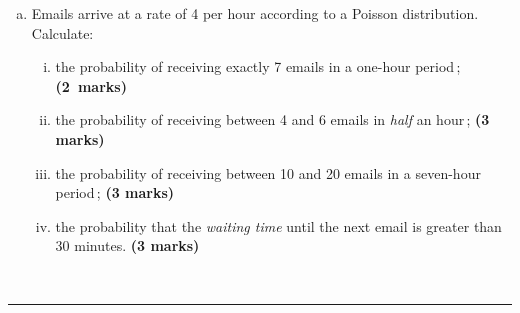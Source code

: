 \documentclass[12pt]{article}
\begin{document}
\begin{enumerate}[a)]
\item Emails arrive at a rate of 4 per hour according to a Poisson distribution.\\[0.3cm]
    Calculate:
    \begin{enumerate}[i)]\itemsep0.3cm
    \item the probability of receiving exactly 7 emails in a one-hour period\,; \phantom{aaa}\hfill{\mbox{\scriptsize \bf (2 marks)}}
    \item the probability of receiving between 4 and 6 emails in \emph{half} an hour\,; \phantom{a} \hfill{\scriptsize \bf (3 marks)}
    \item the probability of receiving between 10 and 20 emails in a seven-hour period\,; \phantom{a} \hfill{\scriptsize \bf (3 marks)}
    \item the probability that the \emph{waiting time} until the next email is greater than 30 minutes. \hfill{\scriptsize \bf (3 marks)}
    \end{enumerate}
\end{enumerate}
\quad\\[-0.3cm]
\noindent\rule{\linewidth}{1pt}

\newpage
\end{document}
